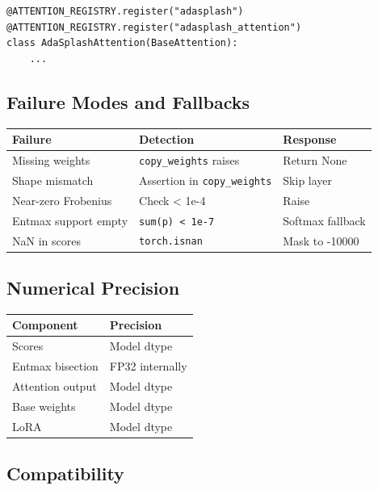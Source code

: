 \begin{lstlisting}
@ATTENTION_REGISTRY.register("adasplash")
@ATTENTION_REGISTRY.register("adasplash_attention")
class AdaSplashAttention(BaseAttention):
    ...
\end{lstlisting}

\subsection{Failure Modes and Fallbacks}

\begin{table}[H]
\centering
\small
\begin{tabular}{lll}
\toprule
\textbf{Failure} & \textbf{Detection} & \textbf{Response} \\
\midrule
Missing weights & \texttt{copy\_weights} raises & Return None \\
Shape mismatch & Assertion in \texttt{copy\_weights} & Skip layer \\
Near-zero Frobenius & Check < 1e-4 & Raise \\
Entmax support empty & \texttt{sum(p) < 1e-7} & Softmax fallback \\
NaN in scores & \texttt{torch.isnan} & Mask to -10000 \\
\bottomrule
\end{tabular}
\end{table}

\subsection{Numerical Precision}

\begin{table}[H]
\centering
\small
\begin{tabular}{ll}
\toprule
\textbf{Component} & \textbf{Precision} \\
\midrule
Scores & Model dtype \\
Entmax bisection & FP32 internally \\
Attention output & Model dtype \\
Base weights & Model dtype \\
LoRA & Model dtype \\
\bottomrule
\end{tabular}
\end{table}

\subsection{Compatibility}

